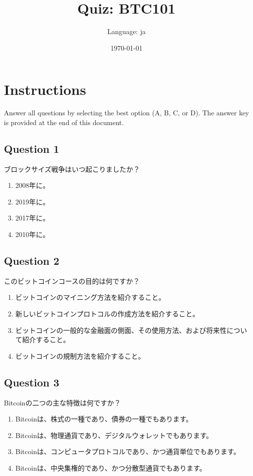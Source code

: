 \documentclass[12pt,a4paper]{article}
\title{Quiz: BTC101}
\author{Language: ja}
\date{\today}
\begin{document}
\maketitle
\thispagestyle{fancy}

\section*{Instructions}
Answer all questions by selecting the best option (A, B, C, or D). The answer key is provided at the end of this document.

\bigskip


\subsection*{Question 1}
ブロックサイズ戦争はいつ起こりましたか？

\begin{enumerate}[label=\Alph*., leftmargin=*]
\item 2008年に。
\item 2019年に。
\item 2017年に。
\item 2010年に。
\end{enumerate}

\bigskip


\subsection*{Question 2}
このビットコインコースの目的は何ですか？

\begin{enumerate}[label=\Alph*., leftmargin=*]
\item ビットコインのマイニング方法を紹介すること。
\item 新しいビットコインプロトコルの作成方法を紹介すること。
\item ビットコインの一般的な金融面の側面、その使用方法、および将来性について紹介すること。
\item ビットコインの規制方法を紹介すること。
\end{enumerate}

\bigskip


\subsection*{Question 3}
Bitcoinの二つの主な特徴は何ですか？

\begin{enumerate}[label=\Alph*., leftmargin=*]
\item Bitcoinは、株式の一種であり、債券の一種でもあります。
\item Bitcoinは、物理通貨であり、デジタルウォレットでもあります。
\item Bitcoinは、コンピュータプロトコルであり、かつ通貨単位でもあります。
\item Bitcoinは、中央集権的であり、かつ分散型通貨でもあります。
\end{enumerate}
\end{document}
